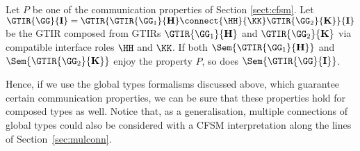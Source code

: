 \begin{corollary}
\label{cor:safetypres}
Let $P$ be one of the communication properties of Section \ref{sect:cfsm}. Let $\GTIR{\GG}{\mathbf{I}} =\GTIR{\GTIR{{\GG}_1}{\mathbf{H}}\connect{\HH}{\KK}\GTIR{{\GG}_2}{\mathbf{K}}}{\mathbf{I}}$
be the GTIR composed from GTIRs $\GTIR{\GG_1}{\mathbf{H}}$
and $\GTIR{\GG_2}{\mathbf{K}}$ via compatible interface roles $\HH$ and $\KK$.
If both $\Sem{\GTIR{\GG_1}{\mathbf{H}}}$ and $\Sem{\GTIR{\GG_2}{\mathbf{K}}}$ enjoy  the property $P$,
so does $\Sem{\GTIR{\GG}{\mathbf{I}}}$.
\end{corollary} 

Hence, if we use the global types formalisms discussed above, which guarantee certain communication properties,
we can be sure that these
properties hold for composed types as well. %
Notice that, as a generalisation, multiple connections of global types could also be considered
with a CFSM interpretation along the lines of Section~\ref{sec:mulconn}. 



